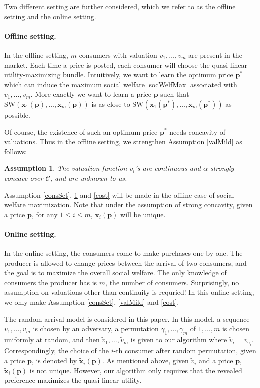 \documentclass{article}
\newtheorem{assumption}{Assumption}[section]
\begin{document}
Two different setting are further considered, which we refer to as the offline setting and the online setting.

\paragraph{Offline setting.}
In the offline setting, $m$ consumers with valuation $v_1,\ldots,v_m$ are present in the market. Each time a price is posted, each consumer will choose the quasi-linear-utility-maximizing bundle. Intuitively, we want to learn the optimum price $\mathbf{p}^*$ which can induce the maximum social welfare \eqref{socWelfMax} associated with $v_1,\ldots,v_m$. More exactly we want to learn a price $\mathbf{p}$ such that $\mathrm{SW}(\mathbf{x}_1(\mathbf{p}),\ldots,\mathbf{x}_m(\mathbf{p}))$ is as close to $\mathrm{SW}(\mathbf{x}_1(\mathbf{p}^*),\ldots,\mathbf{x}_m(\mathbf{p}^*))$ as possible.

Of course, the existence of such an optimum price $\mathbf{p}^*$ needs concavity of valuations. Thus in the offline setting, we strengthen Assumption \ref{valMild} as follows:
\begin{assumption}\label{valStrong}
    The valuation function $v_i$'s are continuous and $\alpha$-strongly concave over $\mathcal{C}$, and are unknown to us.
\end{assumption}
Assumption \ref{consSet}, \ref{valStrong} and \ref{cost} will be made in the offline case of social welfare maximization. Note that under the assumption of strong concavity, given a price $\mathbf{p}$, for any $1\le i\le m$, $\mathbf{x}_i(\mathbf{p})$ will be unique.

\paragraph{Online setting.}
In the online setting, the consumers come to make purchases one by one. The producer is allowed to change prices between the arrival of two consumers, and the goal is to maximize the overall social welfare. The only knowledge of consumers the producer has is $m$, the number of consumers. Surprisingly, no assumption on valuations other than continuity is requried! In this online setting, we only make Assumption \ref{consSet}, \ref{valMild} and \ref{cost}.

The random arrival model is considered in this paper. In this model, a sequence $v_1,\ldots,v_m$ is chosen by an adversary, a permutation $\gamma_1,\ldots,\gamma_m$ of $1,\ldots,m$ is chosen uniformly at random, and then $\tilde{v}_1,\ldots,\tilde{v}_m$ is given to our algorithm where $\tilde{v}_i=v_{\gamma_i}$. Correspondingly, the choice of the $i$-th consumer after random permutation, given a price $\mathbf{p}$, is denoted by $\tilde{\mathbf{x}}_i(\mathbf{p})$. As mentioned above, given $\tilde{v}_i$ and a price $\mathbf{p}$, $\tilde{\mathbf{x}}_i(\mathbf{p})$ is not unique. However, our algorithm only requires that the revealed preference maximizes the quasi-linear utility.
\end{document}
